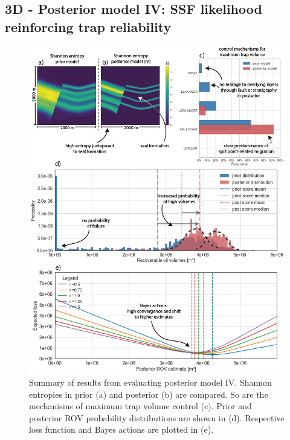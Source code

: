 		\subsection{3D - Posterior model IV: SSF likelihood reinforcing trap reliability}\label{sec:model4}%
		\begin{figure}[p!]
			\centering
			\includegraphics[width=1\textwidth]{Figures/Appendix/ML4}
			\caption{Summary of results from evaluating posterior model IV. Shannon entropies in prior (a) and posterior (b) are compared. So are the mechanisms of maximum trap volume control (c). Prior and posterior ROV probability distributions are shown in (d). Respective loss function and Bayes actions are plotted in (e).}\label{fig:ML4}
		\end{figure}
